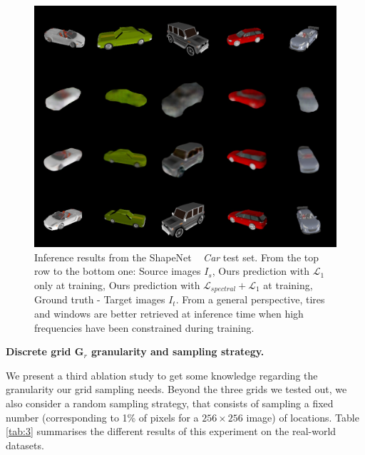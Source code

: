 \begin{figure}[h!]
    \begin{center}
    \includegraphics[width=\textwidth]{images/epipolarnvs/spectralCar.jpg}
    \end{center}
     \caption{Inference results from the ShapeNet ~\cite{chang2015shapenet} \textit{Car} test set. From the top row to the bottom one: Source images  $I_s$, Ours prediction with $\mathcal{L}_{1}$ only at training, Ours prediction with  $\mathcal{L}_{spectral} + \mathcal{L}_{1}$ at training, Ground truth - Target images $I_t$. From a general perspective, tires and windows are better retrieved at inference time when high frequencies have been constrained during training.}
     \label{fig:spectral_res}
\end{figure}

\textbf{Discrete grid $\textbf{G}_{r}$ granularity and sampling strategy.}

We present a third ablation study to get some knowledge regarding the granularity our grid sampling needs. Beyond the three grids we tested out, we also consider a random sampling strategy, that consists of sampling a fixed number (corresponding to 1\% of pixels for a $256\times 256$ image) of locations. Table \ref{tab:3} summarises the different results of this experiment on the real-world datasets.

